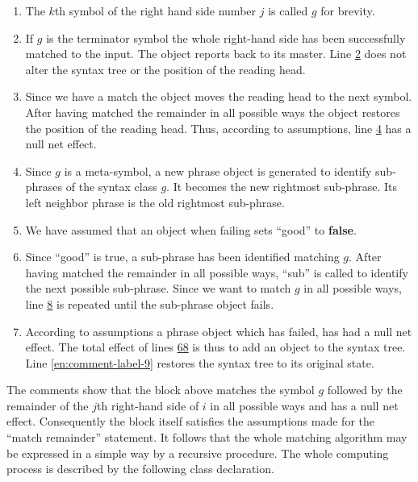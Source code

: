 \begin{enumerate}[leftmargin=*, itemindent=2.2\parindent, nosep, label=Line \arabic*.]
	\item The $k$th symbol of the right hand side number $j$ is called $g$ for brevity.
	\item If $g$ is the terminator symbol the whole right-hand side has been successfully matched to the input. The object reports back to its master. Line \hyperref[en:comment-label-2]{2} does not alter the syntax tree or the position of the reading head.

	\setcounter{enumi}{3}
	\item Since we have a match the object moves the reading head to the next symbol. After having matched the remainder in all possible ways the
	object restores the position of the reading head. Thus, according to assumptions, line \hyperref[en:comment-label-4]{4} has a null net effect. 
	
	\setcounter{enumi}{5}
	\item Since $g$ is a meta-symbol, a new phrase object is generated to identify sub-phrases of the syntax class $g$. It becomes the new rightmost sub-phrase. Its left neighbor phrase is the old rightmost sub-phrase.
	
	\item We have assumed that an object when failing sets ``good'' to \textbf{false}.
	
	\item Since ``good'' is true, a sub-phrase has been identified matching $g$. After having matched the remainder in all possible ways, ``sub'' is 	called to identify the next possible sub-phrase. Since we want to match $g$ in all possible ways, line \hyperref[en:comment-label-8]{8} is repeated until the sub-phrase object fails.
	
	\item According to assumptions a phrase object which has failed, has had a null net effect. The total effect of lines \hyperref[en:comment-label-6]{6}\textendash\hyperref[en:comment-label-8]{8} is thus to add an object to the syntax tree. Line \ref{en:comment-label-9} restores the syntax tree to its original state.
\end{enumerate}

The comments show that the block above matches the symbol $g$ followed by the remainder of the $j$th right-hand side of $i$ in all possible ways and has a null net effect. Consequently the block itself satisfies the assumptions made for the ``match remainder'' statement. It follows that the whole matching algorithm may be expressed in a simple way by a recursive procedure. The whole computing process is described by the following class declaration.

